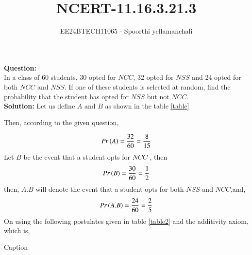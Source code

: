 \documentclass[journal]{IEEEtran}
\begin{document}

\vspace{3cm}

\title{NCERT-11.16.3.21.3}
\author{EE24BTECH11065 - Spoorthi yellamanchali
}
{\let\newpage\relax\maketitle}

\renewcommand{\thefigure}{\theenumi}
\renewcommand{\thetable}{\theenumi}
\setlength{\intextsep}{10pt} %


\renewcommand{\thetable}{\theenumi}


\textbf{Question:}
\\
In a class of 60 students, 30 opted for $NCC$, 32 opted for $NSS$ and 24 opted for both $NCC$ and $NSS$. If one of these students is selected at random, find the probability that the student has opted for $NSS$ but not $NCC$.
\\
\textbf{Solution: }
Let us define $A$ and $B$ as shown in the table \ref{table}
\\
\begin{table}[h!]
    \centering
    

   \label{table}
\end{table}


Then, according to the given question,

\begin{align}
    Pr\left(A\right) = \frac{32}{60} = \frac{8}{15}
\end{align}
Let $B$ be the event that a student opts for $NCC$ , then 
\begin{align}
    Pr\left(B\right) = \frac{30}{60} = \frac{1}{2}
\end{align}
then, $A.B$ will denote the event that a student opts for both $NSS$ and $NCC$,and,
\begin{align}
    Pr\left(A.B\right) = \frac{24}{60} = \frac{2}{5}
\end{align}
On using the following postulates given in table \ref{table2} and the additivity axiom, which is,
\begin{table}[h!]
    \centering
    
    \caption{Caption}
    \label{table2}
\end{table}
\end{document}
